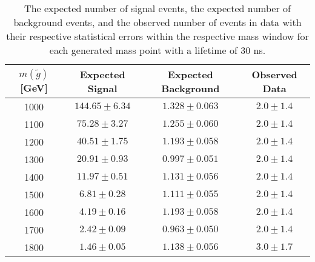 \begin{table}[!htbp]
  \begin{center}
    \begin{tabular}{cccc}
      \hline
      $m(\tilde{g})$ [GeV]  & Expected Signal & Expected Background & Observed Data\\ 
      \hline
      1000    & $144.65 \pm 6.34 $ & $1.328 \pm 0.063 $ & $2.0 \pm 1.4$ \\
      1100    & $75.28 \pm 3.27 $ & $1.255 \pm 0.060 $ & $2.0 \pm 1.4$ \\
      1200    & $40.51 \pm 1.75 $ & $1.193 \pm 0.058 $ & $2.0 \pm 1.4$ \\
      1300    & $20.91 \pm 0.93 $ & $0.997 \pm 0.051 $ & $2.0 \pm 1.4$ \\
      1400    & $11.97 \pm 0.51 $ & $1.131 \pm 0.056 $ & $2.0 \pm 1.4$ \\
      1500    & $6.81 \pm 0.28 $ & $1.111 \pm 0.055 $ & $2.0 \pm 1.4$ \\
      1600    & $4.19 \pm 0.16 $ & $1.193 \pm 0.058 $ & $2.0 \pm 1.4$ \\
      1700    & $2.42 \pm 0.09 $ & $0.963 \pm 0.050 $ & $2.0 \pm 1.4$ \\
      1800    & $1.46 \pm 0.05 $ & $1.138 \pm 0.056 $ & $3.0 \pm 1.7$ \\
      \hline
    \end{tabular}
  \end{center}
  \caption{The expected number of signal events, the expected number of background events, and the observed number of events in data with their respective statistical errors within the respective mass window for each generated mass point with a lifetime of 30 ns.}
  \label{tab:app_counts_30ns}
\end{table}

